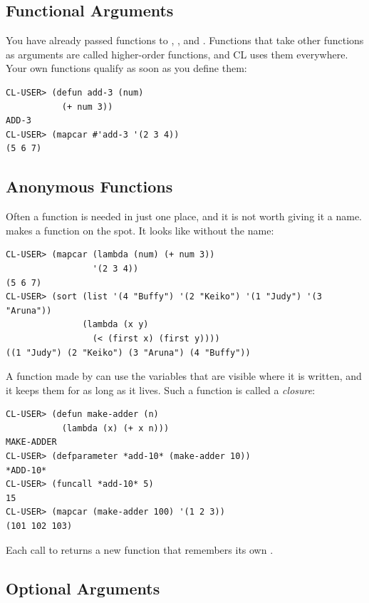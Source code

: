 \subsection{Functional Arguments}

You have already passed functions to , ,
 and . Functions that take other
functions as arguments are called higher-order functions, and CL uses
them everywhere. Your own functions qualify as soon as you define
them:

\begin{verbatim}
CL-USER> (defun add-3 (num)
           (+ num 3))
ADD-3
CL-USER> (mapcar #'add-3 '(2 3 4))
(5 6 7)
\end{verbatim}

\subsection{Anonymous Functions}

Often a function is needed in just one place, and it is not worth
giving it a name.  makes a function on the spot. It
looks like  without the name:

\begin{verbatim}
CL-USER> (mapcar (lambda (num) (+ num 3))
                 '(2 3 4))
(5 6 7)
CL-USER> (sort (list '(4 "Buffy") '(2 "Keiko") '(1 "Judy") '(3 "Aruna"))
               (lambda (x y)
                 (< (first x) (first y))))
((1 "Judy") (2 "Keiko") (3 "Aruna") (4 "Buffy"))
\end{verbatim}

A function made by  can use the variables that are
visible where it is written, and it keeps them for as long as it
lives. Such a function is called a \emph{closure}:

\begin{verbatim}
CL-USER> (defun make-adder (n)
           (lambda (x) (+ x n)))
MAKE-ADDER
CL-USER> (defparameter *add-10* (make-adder 10))
*ADD-10*
CL-USER> (funcall *add-10* 5)
15
CL-USER> (mapcar (make-adder 100) '(1 2 3))
(101 102 103)
\end{verbatim}

Each call to  returns a new function that remembers
its own .

\subsection{Optional Arguments}

